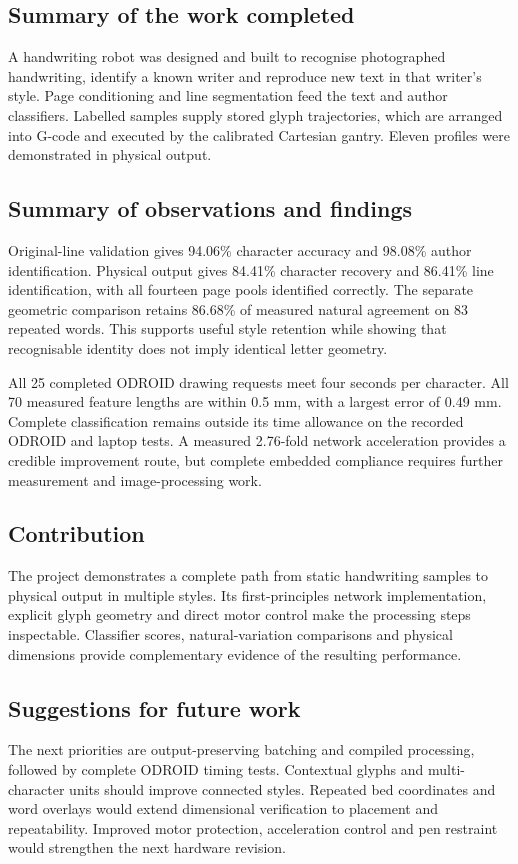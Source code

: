 \subsection{Summary of the work completed}
A handwriting robot was designed and built to recognise photographed handwriting, identify a known writer and reproduce new text in that writer's style. Page conditioning and line segmentation feed the text and author classifiers. Labelled samples supply stored glyph trajectories, which are arranged into G-code and executed by the calibrated Cartesian gantry. Eleven profiles were demonstrated in physical output.

\subsection{Summary of observations and findings}
Original-line validation gives 94.06\% character accuracy and 98.08\% author identification. Physical output gives 84.41\% character recovery and 86.41\% line identification, with all fourteen page pools identified correctly. The separate geometric comparison retains 86.68\% of measured natural agreement on 83 repeated words. This supports useful style retention while showing that recognisable identity does not imply identical letter geometry.

All 25 completed ODROID drawing requests meet four seconds per character. All 70 measured feature lengths are within 0.5 mm, with a largest error of 0.49 mm. Complete classification remains outside its time allowance on the recorded ODROID and laptop tests. A measured 2.76-fold network acceleration provides a credible improvement route, but complete embedded compliance requires further measurement and image-processing work.

\subsection{Contribution}
The project demonstrates a complete path from static handwriting samples to physical output in multiple styles. Its first-principles network implementation, explicit glyph geometry and direct motor control make the processing steps inspectable. Classifier scores, natural-variation comparisons and physical dimensions provide complementary evidence of the resulting performance.

\subsection{Suggestions for future work}
The next priorities are output-preserving batching and compiled processing, followed by complete ODROID timing tests. Contextual glyphs and multi-character units should improve connected styles. Repeated bed coordinates and word overlays would extend dimensional verification to placement and repeatability. Improved motor protection, acceleration control and pen restraint would strengthen the next hardware revision.
